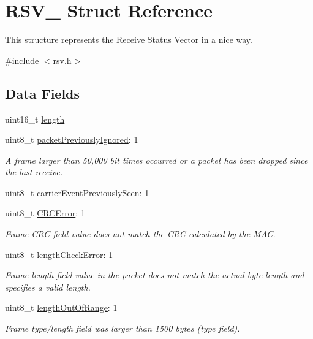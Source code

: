 \hypertarget{struct_r_s_v__}{}\section{R\+S\+V\+\_\+ Struct Reference}
\label{struct_r_s_v__}


This structure represents the Receive Status Vector in a nice way.  




{\ttfamily \#include $<$rsv.\+h$>$}

\subsection*{Data Fields}
\begin{DoxyCompactItemize}
\item 
uint16\+\_\+t \mbox{\hyperlink{struct_r_s_v___a1892eba2086d12ac2b09005aeb09ea3b}{length}}
\item 
uint8\+\_\+t \mbox{\hyperlink{struct_r_s_v___a91c26b9645e5edca1e4c4f13c76631a2}{packet\+Previously\+Ignored}}\+: 1
\begin{DoxyCompactList}\small\item\em A frame larger than 50,000 bit times occurred or a packet has been dropped since the last receive. \end{DoxyCompactList}\item 
uint8\+\_\+t \mbox{\hyperlink{struct_r_s_v___a009a3b631b303f95d25e18876d2bcf6c}{carrier\+Event\+Previously\+Seen}}\+: 1
\item 
uint8\+\_\+t \mbox{\hyperlink{struct_r_s_v___a331925f67a8efb3a251601448de7b1eb}{C\+R\+C\+Error}}\+: 1
\begin{DoxyCompactList}\small\item\em Frame C\+RC field value does not match the C\+RC calculated by the M\+AC. \end{DoxyCompactList}\item 
uint8\+\_\+t \mbox{\hyperlink{struct_r_s_v___aa1ee2560cad39e2579609aa0bbe23622}{length\+Check\+Error}}\+: 1
\begin{DoxyCompactList}\small\item\em Frame length field value in the packet does not match the actual byte length and specifies a valid length. \end{DoxyCompactList}\item 
uint8\+\_\+t \mbox{\hyperlink{struct_r_s_v___addceef1c25a3a79f0809d2088d7fad31}{length\+Out\+Of\+Range}}\+: 1
\begin{DoxyCompactList}\small\item\em Frame type/length field was larger than 1500 bytes (type field). \end{DoxyCompactList}\item 

\end{DoxyCompactItemize}

